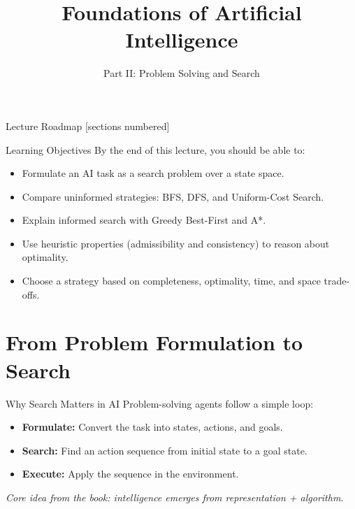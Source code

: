 \documentclass[10pt]{beamer}
\title{Foundations of Artificial Intelligence}
\subtitle{Part II: Problem Solving and Search}
\institute{Department of Computer Science}
\date{}
\begin{document}
\maketitle

\begin{frame}{Lecture Roadmap}
    [sections numbered]
    \tableofcontents[hideallsubsections]
\end{frame}

\begin{frame}{Learning Objectives}
    By the end of this lecture, you should be able to:
    \begin{itemize}
        \item Formulate an AI task as a search problem over a state space.
        \item Compare uninformed strategies: BFS, DFS, and Uniform-Cost Search.
        \item Explain informed search with Greedy Best-First and A*.
        \item Use heuristic properties (admissibility and consistency) to reason about optimality.
        \item Choose a strategy based on completeness, optimality, time, and space trade-offs.
    \end{itemize}
\end{frame}

\section{From Problem Formulation to Search}

\begin{frame}{Why Search Matters in AI}
    Problem-solving agents follow a simple loop:
    \begin{center}
    \end{center}
    \vspace{0.3cm}
    \begin{itemize}
        \item \textbf{Formulate:} Convert the task into states, actions, and goals.
        \item \textbf{Search:} Find an action sequence from initial state to a goal state.
        \item \textbf{Execute:} Apply the sequence in the environment.
    \end{itemize}
    \vspace{0.2cm}
    \textit{Core idea from the book: intelligence emerges from representation + algorithm.}
\end{frame}
\end{document}
